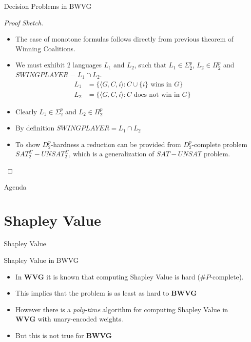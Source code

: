 \documentclass{beamer}
\begin{document}
\begin{frame}[fragile]{Decision Problems in BWVG}
  \begin{proof}[Proof Sketch]
    \begin{itemize}
      \item The case of monotone formulas follows directly from previous theorem of Winning Coalitions.
      \item We must exhibit 2 languages $L_1$ and $L_2$, such that $L_1 \in \Sigma_2^p$, $L_2 \in \Pi_2^p$ and $SWINGPLAYER = L_1 \cap L_2$.
      \begin{subequations}
        \begin{align}
          L_1 &= \{ \langle G, C, i \rangle : C \cup \{i\} \text{ wins in } G \}\\
          L_2 &= \{ \langle G, C, i \rangle : C \text{ does not win in } G \}
        \end{align}
      \end{subequations}
      \item Clearly $L_1 \in \Sigma_2^p$ and $L_2 \in \Pi_2^p$
      \item By definition $SWINGPLAYER = L_1 \cap L_2$
      \item To show $D_2^p$-hardness a reduction can be provided from $D_2^p$-complete problem $SAT_2^\Sigma-UNSAT_2^\Sigma$, which is a generalization of $SAT-UNSAT$ problem.
    \end{itemize}
  \end{proof}
\end{frame}

\begin{frame}[fragile]{Agenda}
  \section{Shapley Value}
  \tableofcontents[currentsection]
\end{frame}

\begin{frame}[fragile]{Shapley Value}
  \begin{block}{Shapley Value in BWVG}
    \begin{itemize}
      \item In \textbf{WVG} it is known that computing Shapley Value is hard ($\# P$-complete).
      \item This implies that the problem is as least as hard to \textbf{BWVG}
      \item However there is a \textit{poly-time} algorithm for computing Shapley Value in \textbf{WVG} with unary-encoded weights.
      \item But this is not true for \textbf{BWVG}
    \end{itemize}
  \end{block}
\end{frame}
\end{document}
